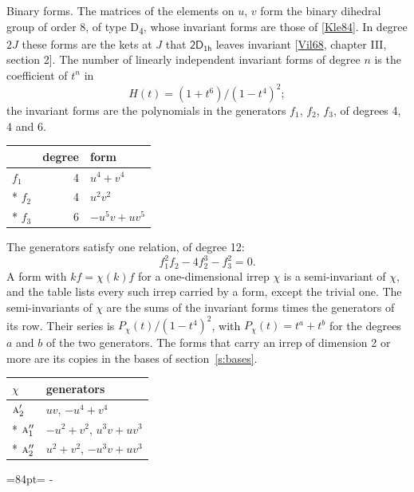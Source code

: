 \documentclass[10pt,a4paper]{article}
\makeatletter
\renewcommand\paragraph{\@startsection{paragraph}{4}{\z@}{1.5ex plus .5ex minus .2ex}{-1em}%
  {\normalfont\small\sffamily\bfseries\color{parttitle}}}
\newcommand{\needspace}[1]{\par\penalty-100\begingroup\dimen0=#1\relax\dimen2=\pagegoal
  \advance\dimen2-\pagetotal\ifdim\dimen0>\dimen2\relax\ifdim\dimen2>0pt\vfil\break\fi\fi
  \endgroup}
\numberwithin{equation}{section}
\newcommand{\grp}[1]{\mathsf{#1}}
\newcommand{\irr}[1]{\text{\normalfont\scshape #1}}
\makeatother
\begin{document}
\paragraph{Binary forms.}
The matrices of the elements on $u$, $v$ form the binary dihedral group of order 8, of type D\textsubscript{4}, whose invariant forms are those of [\href{../../../REFERENCES.pdf\#ref.Kle84}{Kle84}]. In degree $2J$ these forms are the kets at $J$ that $\grp{2D_{1h}}$ leaves invariant [\href{../../../REFERENCES.pdf\#ref.Vil68}{Vil68}, chapter III, section 2]. \label{n:head.degree}\label{n:head.form}The number of linearly independent invariant forms of degree $n$ is the coefficient of $t^n$ in
\begin{equation}\label{e:molien}H(t) = (1 + t^{6})/(1-t^{4})^{2};\end{equation}
the invariant forms are the polynomials in the generators $f_1$, $f_2$, $f_3$, of degrees 4, 4 and 6.
{\small\begin{longtable}{@{}lrl@{}}\toprule
& degree & form\\\midrule\endhead
\bottomrule\endfoot\endlastfoot
$f_{1}$ & 4 & $u^{4} + v^{4}$\\*
$f_{2}$ & 4 & $u^{2}v^{2}$\\*
$f_{3}$ & 6 & $-u^{5}v + uv^{5}$\\
\bottomrule\end{longtable}}
The generators satisfy one relation, of degree 12:
\begin{equation}\label{e:relation}f_{1}^{2}f_{2} - 4f_{2}^{3} - f_{3}^{2} = 0.\end{equation}
A form with $k f = \chi(k) f$ for a one-dimensional irrep $\chi$ is a semi-invariant of $\chi$, and the table lists every such irrep carried by a form, except the trivial one. \label{n:head.generators}The semi-invariants of $\chi$ are the sums of the invariant forms times the generators of its row. Their series is $P_\chi(t)/(1-t^{4})^{2}$, with $P_\chi(t) = t^{a} + t^{b}$ for the degrees $a$ and $b$ of the two generators. The forms that carry an irrep of dimension 2 or more are its copies in the bases of section~\ref{s:bases}.
{\small\begin{longtable}{@{}ll@{}}\toprule
$\chi$ & generators\\\midrule\endhead
\bottomrule\endfoot\endlastfoot
$\irr{a}_{2}'$ & $uv$, $-u^{4} + v^{4}$\\*
$\irr{a}_{1}''$ & $-u^{2} + v^{2}$, $u^{3}v + uv^{3}$\\*
$\irr{a}_{2}''$ & $u^{2} + v^{2}$, $-u^{3}v + uv^{3}$\\
\bottomrule\end{longtable}}
\needspace{84pt}
\end{document}
